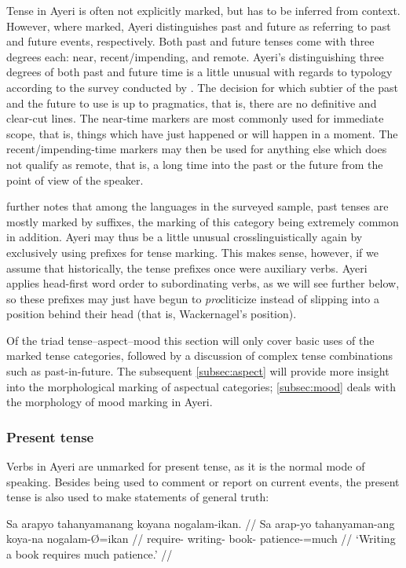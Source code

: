 Tense in Ayeri is often not explicitly marked, but has to be inferred from 
context. However, where marked, Ayeri distinguishes past and future as 
referring to past and future events, respectively. Both past and future 
tenses come with three degrees each: near, recent/impending, and remote. 
Ayeri's distinguishing three degrees of both past and future time is a little 
unusual with regards to typology according to the survey conducted by 
\citet[127]{dahl1985}. The decision for which subtier of the past and the 
future to use is up to pragmatics, that is, there are no definitive 
and clear-cut lines. The near-time markers are most commonly used for 
immediate scope, that is, things which have just happened or will happen in a 
moment. The recent/impending-time markers may then be used for anything else 
which does not qualify as remote, that is, a long time into the past or the 
future from the point of view of the speaker.

\citet[117]{dahl1985} further notes that among the languages in the surveyed 
sample, past tenses are mostly marked by suffixes, the marking of this 
category being extremely common in addition. Ayeri may thus be a little unusual 
crosslinguistically again by exclusively using prefixes for tense marking. This 
makes sense, however, if we assume that historically, the tense prefixes once 
were auxiliary verbs. Ayeri applies head-first word order to subordinating 
verbs, as we will see further below, so these prefixes may just have begun to 
\emph{pro}cliticize instead of slipping into a position behind their head (that 
is, Wackernagel's position).

Of the triad tense--aspect--mood this section will only cover basic uses of 
the marked tense categories, followed by a discussion of complex tense 
combinations such as past-in-future. The subsequent \autoref{subsec:aspect} 
will provide more insight into the morphological marking of aspectual 
categories; \autoref{subsec:mood} deals with the morphology of mood marking in 
Ayeri.

\subsubsection{Present tense}
Verbs in Ayeri are unmarked for present tense, as it is the normal mode of 
speaking. Besides being used to comment or report on current events, the 
present tense is also used to make statements of general truth:

\ex\begingl
	\gla Sa arapyo tahanyamanang koyana nogalam-ikan. //
	\glb Sa arap-yo tahanyaman-ang koya-na nogalam-Ø=ikan //
	\glc \PatT{} require-\TsgN{} writing-\Aarg{} book-\Gen{} 
		patience-\Top{}=much //
	\glft `Writing a book requires much patience.' //
\endgl\xe


